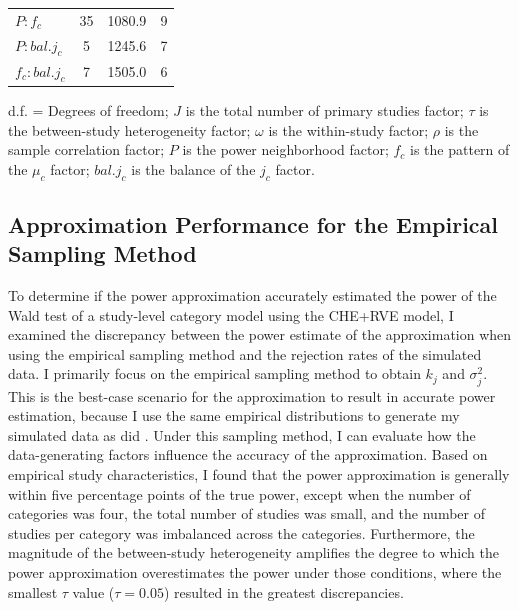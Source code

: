 \begin{table}[H]
\begin{tabular*}{\textwidth}{@{\extracolsep{\fill}}
    l
    S[table-format=2.0]
    S[table-format=5.1]
    S[table-format=2.0]
    }
       $P:f_c$ & 35 & 1080.9 & 9 \\
       $P:bal. j_c$ & 5 & 1245.6 & 7 \\
       $f_c:bal. j_c$ & 7 & 1505.0 & 6 \\
    \bottomrule
    \end{tabular*}
    \begin{flushright}
    \footnotesize d.f. = Degrees of freedom; $J$ is the total number of primary studies factor; $\tau$ is the between-study heterogeneity factor; $\omega$ is the within-study factor; $\rho$ is the sample correlation factor; $P$ is the power neighborhood factor; $f_c$ is the pattern of the $\mu_c$ factor; $bal. j_c$ is the balance of the $j_c$ factor. 
    \end{flushright}
\end{table}


\subsection{Approximation Performance for the Empirical Sampling Method}

To determine if the power approximation accurately estimated the power of the Wald test of a study-level category model using the CHE+RVE model, I examined the discrepancy between the power estimate of the approximation when using the empirical sampling method and the rejection rates of the simulated data. I primarily focus on the empirical sampling method to obtain $k_j$ and $\sigma_j^2$. This is the best-case scenario for the approximation to result in accurate power estimation, because I use the same empirical distributions to generate my simulated data as did \textcite{vembye2023}. Under this sampling method, I can evaluate how the data-generating factors influence the accuracy of the approximation. Based on empirical study characteristics, I found that the power approximation is generally within five percentage points of the true power, except when the number of categories was four, the total number of studies was small, and the number of studies per category was imbalanced across the categories. Furthermore, the magnitude of the between-study heterogeneity amplifies the degree to which the power approximation overestimates the power under those conditions, where the smallest $\tau$ value ($\tau = 0.05$) resulted in the greatest discrepancies. 

